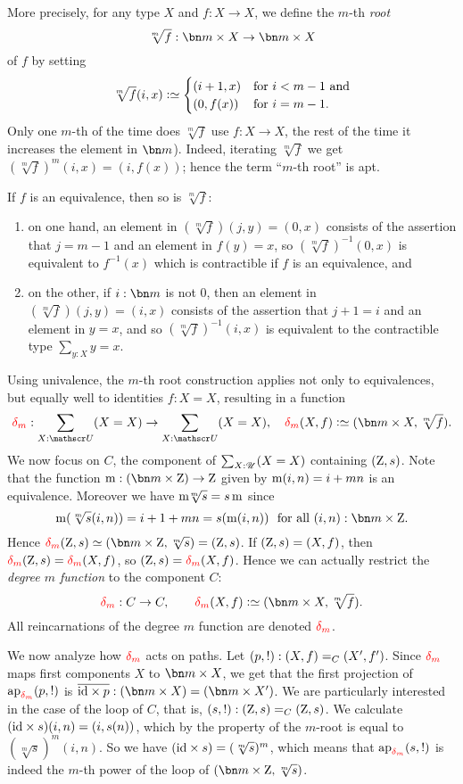 \begin{example}
More precisely, for any type $X$ and $f:X\to X$, we define the $m$-th \emph{root}
\[
{\sqrt[m]f} : {\bn m\times X} \to {\bn m\times X}
\]
of $f$ by setting 
\[
\sqrt[m]f(i,x)\defeq
\begin{cases}
  (i+1,x)& \text{for $i<m-1$ and}\\
  (0,f(x))& \text{for $i=m-1$}.
\end{cases}
\] 
Only one $m$-th of the time does $\sqrt[m]f$ use $f:X\to X$,
the rest of the time it increases the element in $\bn m$).
Indeed, iterating $\sqrt[m]f$ we get $(\sqrt[m]f)^m(i,x)=(i,f(x))$; 
hence the term ``$m$-th root'' is apt.

If $f$ is an equivalence, then so is $\sqrt[m]f$:
\begin{enumerate}
\item on one hand, an element in  $(\sqrt[m]f)(j,y) = (0,x)$ consists 
of the assertion that  $j=m-1$ and an element in $f(y)=x$,
so  $(\sqrt[m]f)^{-1}(0,x)$ is equivalent 
to $f^{-1}(x)$ which is contractible if $f$ is an equivalence, and 
\item on the other, if $i:\bn m$ is not $0$, then 
 an element in $(\sqrt[m]f)(j,y)=(i,x)$
 consists of the assertion that $j+1=i$ and an element in   $y=x$, and so 
$(\sqrt[m]f)^{-1}(i,x)$ is equivalent to the contractible type $\sum_{y:X}y=x$.
\end{enumerate}

Using univalence, the $m$-th root construction applies not only to equivalences, 
but equally well to identities $f:X=X$, resulting in a function 
\[
\dg{m}:\sum_{X:\UU}(X=X)\to\sum_{X:\UU}(X=X),\quad \dg{m}(X,f)\defeq(\bn m\times X,\sqrt[m]f).
\]
We now focus on  $C$, the component of $\sum_{X:{\mathscr{U}}}(X=X)$ containing $(\mathrm{Z},{s})$.
Note that the function $\mZ : (\bn m\times \zet) \to \zet$ 
given by $\mZ(i,n)=i+mn$ is an equivalence. 
Moreover we have ${\mZ\!\!\sqrt[m]s} = {s\mZ}$ since 
\[
\mZ(\sqrt[m]s(i,n)) = i+1+mn = s(\mZ(i,n))
~~\text{for all $(i,n):\bn m\times \zet$}.
\]  
Hence $ \dg{m}(\zet,\etop{s}) \jdeq (\bn m\times\zet,\sqrt[m]{\etop{s}}) = (\zet,\etop{s})$. 
If $(\mathrm{Z},{s})=(X,f)$, then $\dg{m}(\zet,\etop{s})=\dg{m}(X,f)$, 
so $(\zet,\etop{s})=\dg{m}(X,f)$. Hence we can actually restrict the
\emph{degree $m$ function} to the component $C$: 
\[
\dg{m}:C\to C,\qquad \dg{m}(X,f)\defeq(\bn m\times X,\sqrt[m]f).%
\]
All reincarnations of the degree $m$ function are denoted $\dg{m}$.

We now analyze how $\dg{m}$ acts on paths. Let $({p},!):(X,f)=_C(X',f')$.
Since $\dg{m}$ maps first components $X$ to $\bn m\times X$, we get that
the first projection of $\ap{\dg{m}}(\etop{p},!)$ is 
$\overline{\id\times p} : (\bn m\times X) = (\bn m\times X')$.
We are particularly interested in the case of the loop of $C$, 
that is, $({s},!):(\mathrm{Z},{s})=_C(\mathrm{Z},{s})$.
We calculate $(\mathord{\mathrm{id}}\times s)(i,n) = (i,s(n))$,
which by the property of the $m$-root is equal to $(\sqrt[m]s)^m(i,n)$.
So we have $(\mathord{\mathrm{id}}\times s)=(\sqrt[m]s)^m$, which means that
$\ap{\dg{m}}(\etop{s},!)$ is indeed the $m$-th power of the
loop of $(\bn m\times \zet,\sqrt[m]{\etop{s}})$.


\end{example}
